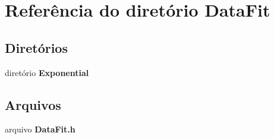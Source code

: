 \section{Referência do diretório Data\+Fit}
\label{dir_532c40b2bad756e423b6b3a93464d512}
\subsection*{Diretórios}
\begin{DoxyCompactItemize}
\item 
diretório {\bf Exponential}
\end{DoxyCompactItemize}
\subsection*{Arquivos}
\begin{DoxyCompactItemize}
\item 
arquivo {\bf Data\+Fit.\+h}
\end{DoxyCompactItemize}
